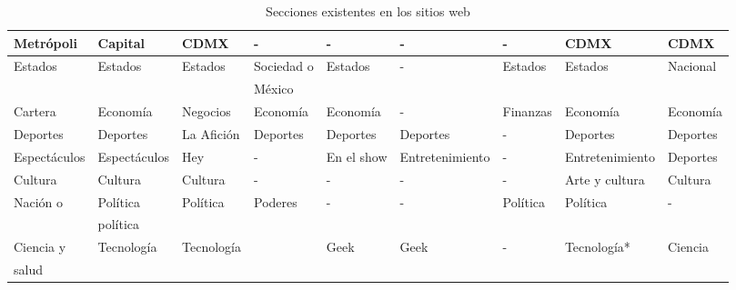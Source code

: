 \begin{table}[htbp]
{\begin{tabular}[H]{|l|l|l|l|l|l|l|l|l|}
        Metrópoli     & Capital      & CDMX          & -                     & -             & -         & -                 & CDMX          & CDMX      \\ 
        \hline

        Estados       & Estados      & Estados       & Sociedad o       & Estados       & -         & Estados           & Estados       & Nacional   \\ 
        & & & México & & & & & \\ 
        \hline

        Cartera       & Economía     & Negocios      & Economía              & Economía      & -         & Finanzas          & Economía      & Economía   \\ 
        \hline

        Deportes      & Deportes     & La Afición    & Deportes              & Deportes      & Deportes  & -                 & Deportes      & Deportes   \\ 
        \hline

        Espectáculos  & Espectáculos & Hey           & -                     & En el show    & Entretenimiento & -           & Entretenimiento & Deportes    \\ 
        \hline

        Cultura       & Cultura      & Cultura       & -                     & -             & -         & -                 & Arte y cultura & Cultura   \\ 
        \hline

        Nación o & Política   & Política      & Poderes               & -             & -         & Política          & Política      & -   \\ 
        & política & & & & & & & \\ 
        \hline

        Ciencia y & Tecnología & Tecnología    &                       & Geek          & Geek      & -                 & Tecnología*      & Ciencia\\
        salud & & & & & & & & \\ 
        \hline        

    \end{tabular}%
}
\caption[Tabla]{Secciones existentes en los sitios web}
\label{tabla:sitios}
\end{table}


